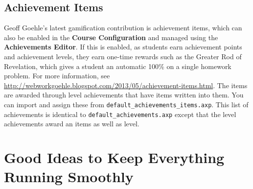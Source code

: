 \documentclass[12pt]{article}
\newcommand{\menu}[1]{\textbf{#1}}
\begin{document}
\subsection{Achievement Items}

Geoff Goehle's latest gamification contribution is achievement items, which can also be enabled in the \menu{Course Configuration} and managed using the \menu{Achievements Editor}. If this is enabled, as students earn achievement points and achievement levels, they earn one-time rewards such as the Greater Rod of Revelation, which gives a student an automatic 100\% on a single homework problem. For more information, see \url{http://webworkgoehle.blogspot.com/2013/05/achievement-items.html}. The items are awarded through level achievements that have items written into them. You can import and assign these from  \verb=default_achievements_items.axp=. This list of achievements is identical to \verb=default_achievements.axp= except that the level achievements award an items as well as level.

\section{Good Ideas to Keep Everything Running Smoothly}\label{goodideas}
\end{document}
